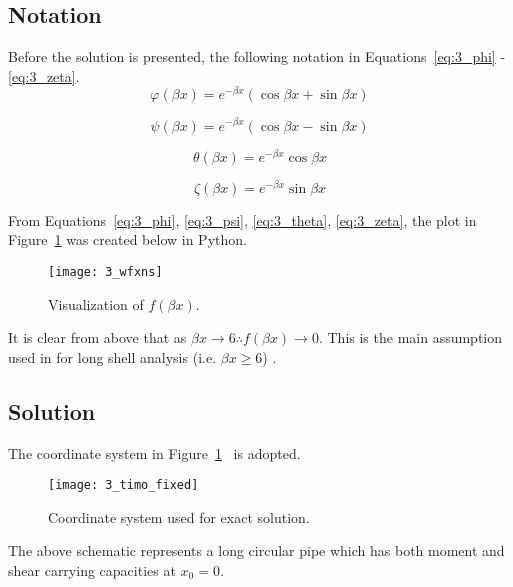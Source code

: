 \subsection{Notation}

Before the solution is presented, the following notation in Equations~\ref{eq:3_phi} - \ref{eq:3_zeta}.
\begin{equation}
	\label{eq:3_phi}
	\varphi (\beta x) = e^{-\beta x} \left(\cos \beta x + \sin \beta x \right)
\end{equation}

\begin{equation}
	\label{eq:3_psi}
	\psi (\beta x) = e^{-\beta x} \left(\cos \beta x - \sin \beta x \right)
\end{equation}

\begin{equation}
	\label{eq:3_theta}
	\theta (\beta x) = e^{-\beta x} \cos \beta x
\end{equation}

\begin{equation}
	\label{eq:3_zeta}
	\zeta (\beta x) = e^{-\beta x} \sin \beta x
\end{equation}

From Equations~\ref{eq:3_phi}, \ref{eq:3_psi}, \ref{eq:3_theta}, \ref{eq:3_zeta}, the plot in Figure~\ref{fig:3_wfxsn} was created below in Python.
\begin{figure}[H]
	\centering
	\texttt{[image: 3\_wfxns]}
	\caption{Visualization of $f(\beta x)$.}
	\label{fig:3_wfxsn}
\end{figure}

It is clear from above that as $\beta x \rightarrow 6 \therefore f(\beta x) \rightarrow 0$. This is the main assumption used in for long shell analysis (i.e. $\beta x \geq 6$) \cite{roarks}.

\subsection{Solution}

The coordinate system in Figure~\ref{fig:3_wfxsn}~\cite{timoshenko1959theory} is adopted.
\begin{figure}[H]
	\centering
	\texttt{[image: 3\_timo\_fixed]}
	\caption{Coordinate system used for exact solution.}
	\label{fig:CoordSyst}
\end{figure}

The above schematic represents a long circular pipe which has both moment and shear carrying capacities at $x_0=0$.\\

